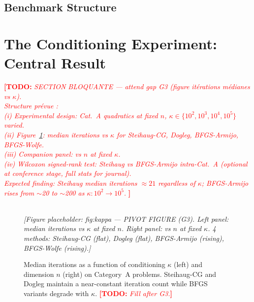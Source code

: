 \documentclass[11pt,a4paper]{article}
\newcommand{\TODO}[1]{\textcolor{red}{\textbf{[TODO:} \textit{#1}\textbf{]}}}
\newcommand{\FIG}[1]{%
  \begin{center}
    \fbox{\rule{0pt}{3.5cm}\rule{0.85\linewidth}{0pt}}\\[2pt]
    {\small\textit{[Figure placeholder: #1]}}
  \end{center}}
\newcommand{\TAB}[1]{%
  \begin{center}
    \fbox{\parbox{0.85\linewidth}{\centering\vspace{1.2em}
      \small\textit{[Table placeholder: #1]}\vspace{1.2em}}}
  \end{center}}
\newcommand{\SteihaugCG}{Steihaug-CG\xspace}
\begin{document}
\subsection{Benchmark Structure}

\TAB{Table: benchmark --- 3 categories × 5 dimensions × nb problems
= 180 instances. Cat.~A: quadratics with $\kappa \in \{10^2,...,10^5\}$,
Rosenbrock, Wood, Dixon-Price; Cat.~B: non-convex (Rastrigin, Ackley,
CUTEst BROYDN3D, CHAINWOO, ...); Cat.~C: indefinite Hessian at $x^*$.}

\section{The Conditioning Experiment: Central Result}
\label{sec:cond}

\TODO{%
  SECTION BLOQUANTE --- attend gap G3 (figure itérations médianes vs $\kappa$).\\
  Structure prévue :\\
  (i)  Experimental design: Cat.~A quadratics at fixed $n$,
       $\kappa \in \{10^2, 10^3, 10^4, 10^5\}$ varied.\\
  (ii) Figure~\ref{fig:kappa}: median iterations vs $\kappa$ for
       Steihaug-CG, Dogleg, BFGS-Armijo, BFGS-Wolfe.\\
  (iii) Companion panel: vs $n$ at fixed $\kappa$.\\
  (iv) Wilcoxon signed-rank test: Steihaug vs BFGS-Armijo intra-Cat.~A
       (optional at conference stage, full stats for journal).\\
  Expected finding: Steihaug median iterations $\approx 21$ regardless
  of $\kappa$; BFGS-Armijo rises from $\sim$20 to $\sim$200 as
  $\kappa: 10^2 \to 10^5$.
}

\begin{figure}[htbp]
  \centering
  \FIG{fig:kappa --- PIVOT FIGURE (G3). Left panel: median iterations
       vs $\kappa$ at fixed $n$. Right panel: vs $n$ at fixed $\kappa$.
       4 methods: Steihaug-CG (flat), Dogleg (flat), BFGS-Armijo
       (rising), BFGS-Wolfe (rising).}
  \caption{Median iterations as a function of conditioning $\kappa$
    (left) and dimension $n$ (right) on Category~A problems.
    \SteihaugCG and Dogleg maintain a near-constant iteration count
    while BFGS variants degrade with $\kappa$.
    \TODO{Fill after G3.}}
  \label{fig:kappa}
\end{figure}
\end{document}
